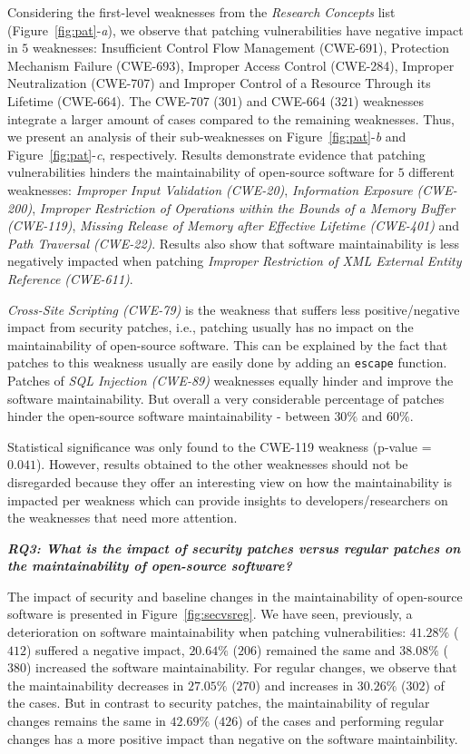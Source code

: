 \documentclass[10pt,conference]{IEEEtran}
\begin{document}
Considering the first-level weaknesses from the \emph{Research Concepts}
list (Figure~\ref{fig:pat}-\emph{a}), we observe that patching vulnerabilities
have negative impact in $5$ weaknesses: Insufficient Control Flow Management 
(CWE-691), Protection Mechanism Failure (CWE-693), Improper Access Control 
(CWE-284), Improper Neutralization (CWE-707) and Improper Control of a Resource 
Through its Lifetime (CWE-664). The CWE-707 ($301$) and CWE-664 ($321$) 
weaknesses integrate a larger amount of cases compared to the remaining 
weaknesses. Thus, we present an analysis of their sub-weaknesses on 
Figure~\ref{fig:pat}-\emph{b} and Figure~\ref{fig:pat}-\emph{c}, respectively. 
Results demonstrate evidence that patching vulnerabilities hinders 
the maintainability of open-source software for $5$ different weaknesses: 
\emph{Improper Input Validation (CWE-20)}, \emph{Information Exposure 
(CWE-200)}, \emph{Improper Restriction of Operations within the Bounds of 
a Memory Buffer (CWE-119)}, \emph{Missing Release of Memory after Effective 
Lifetime (CWE-401)} and \emph{Path Traversal (CWE-22)}. Results also show that 
software maintainability is less negatively impacted when patching 
\emph{Improper Restriction of XML External Entity Reference (CWE-611)}.  

\emph{Cross-Site Scripting (CWE-79)} is the weakness that suffers less 
positive/negative impact from security patches, i.e., patching usually 
has no impact on the maintainability of open-source software. This can 
be explained by the fact that patches to this weakness usually are easily 
done by adding an \texttt{escape} function. Patches of \emph{SQL Injection
(CWE-89)} weaknesses equally hinder and improve the software maintainability. 
But overall a very considerable percentage of patches hinder the open-source 
software maintainability - between $30\%$ and $60\%$. 

Statistical significance was only found to the CWE-119 weakness (p-value = 
$0.041$). However, results obtained to the other weaknesses should not be 
disregarded because they offer an interesting view on how the maintainability 
is impacted per weakness which can provide insights to developers/researchers
on the weaknesses that need more attention.

\textit{\textbf{RQ3: What is the impact of security patches versus regular 
patches on the maintainability of open-source software?}}

The impact of security and baseline changes in the maintainability of
open-source software is presented in Figure~\ref{fig:secvsreg}.  
We have seen, previously, a deterioration on software maintainability 
when patching vulnerabilities: $41.28\%$ ($412$) suffered a 
negative impact, $20.64\%$ ($206$) remained the same and $38.08\%$ 
($380$) increased the software maintainability. For regular changes, 
we observe that the maintainability decreases in $27.05\%$ ($270$) 
and increases in $30.26\%$ ($302$) of the cases. But in contrast to 
security patches, the maintainability of regular changes remains the 
same in $42.69\%$ ($426$) of the cases and performing regular
changes has a more positive impact than negative on the software 
maintainbility. 
\end{document}

